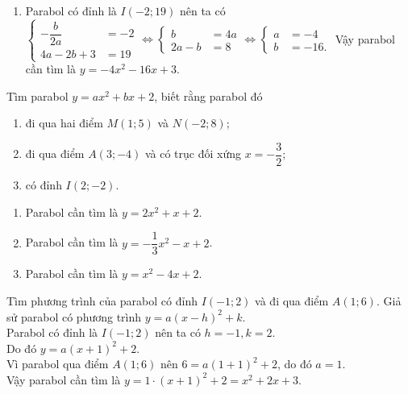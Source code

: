 \begin{bt}
{\begin{enumerate}
			Vậy parabol cần tìm là $y=2 x^2+4 x+3$.
			\item Parabol có đỉnh là $I(-2; 19)$ nên ta có $\left\{\begin{aligned} -\dfrac{b}{2 a}&=-2 \\4 a-2 b+3&=1 9\end{aligned} \Leftrightarrow \left\{\begin{aligned} b&=4 a \\2 a-b&=8\end{aligned} \Leftrightarrow \left\{\begin{aligned}a&=-4 \\b&=-16.\end{aligned}\right.\right.\right.$
			Vậy parabol cần tìm là $y=-4 x^2-16 x+3$.
		\end{enumerate}
	}
\end{bt}

\begin{bt}%
	Tìm parabol $y=a x^2+b x+2$, biết rằng parabol đó
	\begin{enumerate}
		\item đi qua hai điểm $M(1; 5)$ và $N(-2; 8)$;
		\item đi qua điểm $A(3;-4)$ và có trục đối xứng $x=-\dfrac{3}{2}$;
		\item có đỉnh $I(2;-2)$.
	\end{enumerate}
	\loigiai
	{
		\begin{enumerate}
			\item Parabol cần tìm là $y=2 x^2+x+2$.
			\item Parabol cần tìm là $y=-\dfrac{1}{3} x^2-x+2$.
			\item Parabol cần tìm là $y=x^2-4 x+2$.
		\end{enumerate}
	}
\end{bt}

\begin{bt}%
	Tìm phương trình của parabol có đỉnh $I(-1; 2)$ và đi qua điểm $A(1; 6)$.
	\loigiai
	{
		Giả sử parabol có phương trình $y=a(x-h)^2+k$.\\
		Parabol có đỉnh là $I(-1; 2)$ nên ta có $h=-1, k=2$.\\
		Do đó $y=a(x+1)^2+2$.\\
		Vì parabol qua điểm $A(1; 6)$ nên $6=a(1+1)^2+2$, do đó $a=1$.\\
		Vậy parabol cần tìm là $y=1 \cdot(x+1)^2+2=x^2+2 x+3$.
	}
\end{bt}

